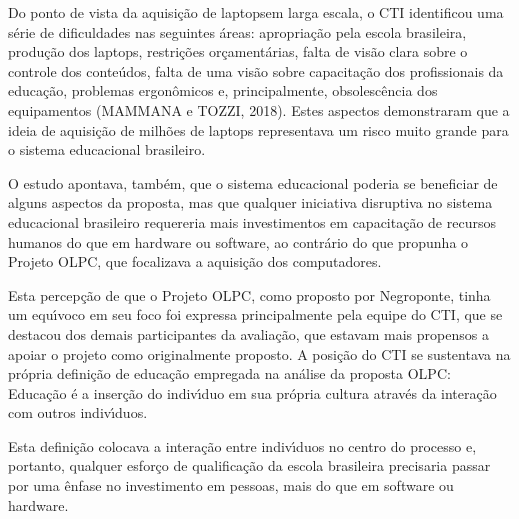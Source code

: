 \documentclass[
12pt,		%
openright,	%
twoside,  %
a4paper,			%
chapter=TITLE,		%
english,			%
french,				%
spanish,			%
brazil				%
]{USPSC-classe/USPSC}
\begin{document}
Do ponto de vista da aquisi\c{c}\~ao de \textquotedbl laptops\textquotedbl  em larga escala, o CTI identificou uma s\'erie de dificuldades nas seguintes \'areas: apropria\c{c}\~ao pela escola brasileira, produ\c{c}\~ao dos laptops, restri\c{c}\~oes or\c{c}ament\'arias, falta de vis\~ao clara sobre o controle dos conte\'udos, falta de uma vis\~ao sobre capacita\c{c}\~ao dos profissionais da educa\c{c}\~ao, problemas ergon\^omicos e, principalmente, obsolesc\^encia dos equipamentos  (MAMMANA e TOZZI, 2018). Estes aspectos demonstraram que a ideia de aquisi\c{c}\~ao de milh\~oes de laptops representava um risco muito grande para o sistema educacional brasileiro.










O estudo apontava, tamb\'em, que o sistema educacional poderia se beneficiar de alguns aspectos da proposta, mas que qualquer iniciativa disruptiva no sistema educacional brasileiro requereria mais investimentos em capacita\c{c}\~ao de recursos humanos do que em hardware ou software, ao contr\'ario do que propunha o Projeto OLPC, que focalizava a aquisi\c{c}\~ao dos computadores.










Esta percep\c{c}\~ao de que o Projeto OLPC, como proposto por Negroponte, tinha um equ\'{\i}voco em seu foco foi expressa principalmente pela equipe do CTI, que se destacou dos demais participantes da avalia\c{c}\~ao, que estavam mais propensos a apoiar o projeto como originalmente proposto. A posi\c{c}\~ao do CTI se sustentava na pr\'opria defini\c{c}\~ao de educa\c{c}\~ao empregada na an\'alise da proposta OLPC: \textquotedbl Educa\c{c}\~ao \'e a inser\c{c}\~ao do indiv\'{\i}duo em sua pr\'opria cultura atrav\'es da intera\c{c}\~ao com outros indiv\'{\i}duos\textquotedbl .










Esta defini\c{c}\~ao colocava a intera\c{c}\~ao entre indiv\'{\i}duos no centro do processo e, portanto, qualquer esfor\c{c}o de qualifica\c{c}\~ao da escola brasileira precisaria passar por uma \^enfase no investimento em \textquotedbl pessoas, mais do que em software ou hardware\textquotedbl .
\end{document}
